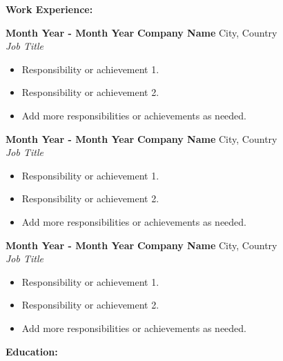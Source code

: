 \documentclass[a4paper,10pt]{article}
\begin{document}
\vspace{5pt}

\textbf{Work Experience:}

\vspace{5pt}

\textbf{Month Year - Month Year} \hfill \textbf{Company Name} \hfill City, Country\\
\textit{Job Title}
\begin{itemize}
    \item Responsibility or achievement 1.
    \item Responsibility or achievement 2.
    \item Add more responsibilities or achievements as needed.
\end{itemize}

\vspace{5pt}

\textbf{Month Year - Month Year} \hfill \textbf{Company Name} \hfill City, Country\\
\textit{Job Title}
\begin{itemize}
    \item Responsibility or achievement 1.
    \item Responsibility or achievement 2.
    \item Add more responsibilities or achievements as needed.
\end{itemize}

\vspace{5pt}

\textbf{Month Year - Month Year} \hfill \textbf{Company Name} \hfill City, Country\\
\textit{Job Title}
\begin{itemize}
    \item Responsibility or achievement 1.
    \item Responsibility or achievement 2.
    \item Add more responsibilities or achievements as needed.
\end{itemize}

\vspace{5pt}

\textbf{Education:}

\vspace{5pt}
\end{document}
